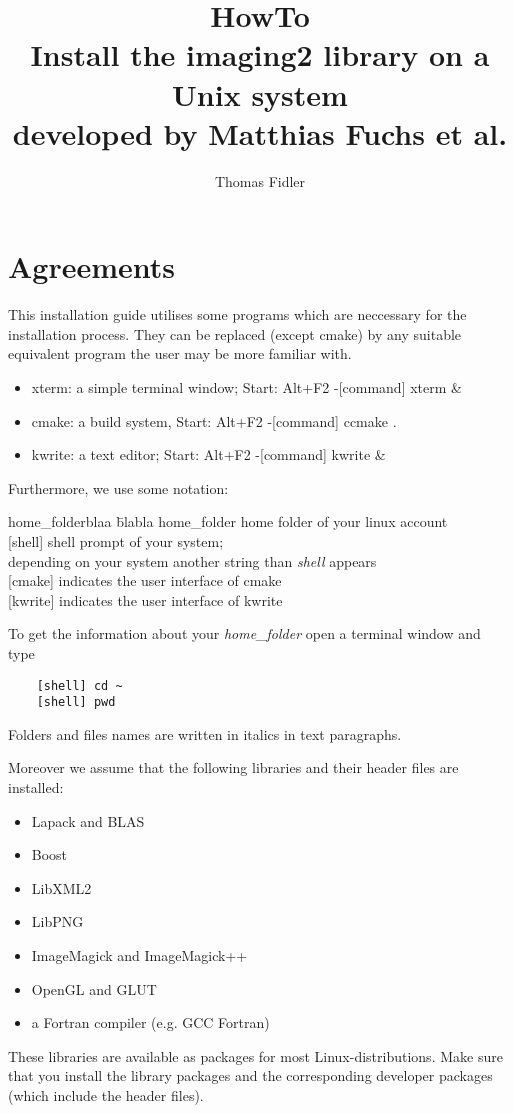 \documentclass[a4paper,10pt]{article}
\title{ {\bf{HowTo}} \\
        Install the imaging2 library on a Unix system \\
        {\small{developed by Matthias Fuchs et al.}}
      }
\author{\small{Thomas Fidler}}
\begin{document}
\maketitle

\section{Agreements}
This installation guide utilises some programs which are neccessary for the installation process. They can be replaced (except cmake)
by any suitable equivalent program the user may be more familiar with.
\begin{itemize}
    \item   xterm: a simple terminal window; Start: Alt+F2 -[command] xterm \&
    \item   cmake: a build system, Start: Alt+F2 -[command] ccmake .
    \item   kwrite: a text editor; Start: Alt+F2 -[command] kwrite \&
\end{itemize}
Furthermore, we use some notation:
\begin{tabbing}
    home\_folderblaa    \=  blabla \kill
    home\_folder        \>  home folder of your linux account \\
    {[shell]}           \>  shell prompt of your system; \\
                        \>  depending on your system another string than \emph{shell} appears \\
    {[cmake]}           \>  indicates the user interface of cmake \\
    {[kwrite]}          \>  indicates the user interface of kwrite \\
\end{tabbing}
To get the information about your \emph{home\_folder} open a terminal window and type
\begin{verbatim}
    [shell] cd ~
    [shell] pwd
\end{verbatim}
Folders and files names are written in italics in text paragraphs.

Moreover we assume that the following libraries and their header files are installed:
\begin{itemize}
 \item Lapack and BLAS
 \item Boost
 \item LibXML2
 \item LibPNG
 \item ImageMagick and ImageMagick++
 \item OpenGL and GLUT
 \item a Fortran compiler (e.g. GCC Fortran)
\end{itemize}
These libraries are available as packages for most Linux-distributions. 
Make sure that you install the library packages and the corresponding developer packages (which include the header files).
\end{document}

